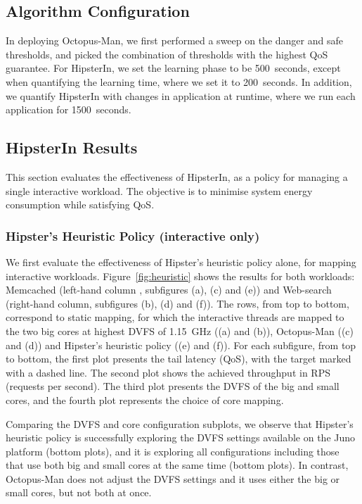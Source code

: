 \subsection{Algorithm Configuration}

In deploying Octopus-Man, we first performed a sweep on the danger and safe thresholds,
and picked the combination of thresholds with the highest QoS guarantee. For HipsterIn, we
set the learning phase to be 500~seconds, except when quantifying the learning time, where
we set it to 200~seconds. In addition, we quantify HipsterIn with changes in application
at runtime, where we run each application for 1500~seconds.



\subsection{HipsterIn Results} 
\label{subsec: results}

This section evaluates the effectiveness of HipsterIn, as a policy for managing a single
interactive workload.  The objective is to minimise system energy consumption while
satisfying QoS.

\subsubsection{Hipster's Heuristic Policy (interactive only)}
\label{subsubsec: heuristic interactive}

 We first evaluate the effectiveness of Hipster's heuristic policy alone, for
mapping interactive workloads. Figure~\ref{fig:heuristic} shows the results for both
workloads: Memcached (left-hand column , subfigures (a), (c) and (e)) and Web-search
(right-hand column, subfigures (b), (d) and (f)). The rows, from top to bottom, correspond
to static mapping, for which the interactive threads are mapped to the two big cores at
highest DVFS of \SI{1.15}{\giga\hertz} ((a) and (b)), Octopus-Man ((c) and (d)) and
Hipster's heuristic policy ((e) and (f)). For each subfigure, from top to bottom, the
first plot presents the tail latency (QoS), with the target marked with a dashed line.
The second plot shows the achieved throughput in RPS (requests per second). The third plot
presents the DVFS of the big and small cores, and the fourth plot represents the choice of
core mapping.

 Comparing the DVFS and core configuration subplots, we observe that
Hipster's heuristic policy is successfully exploring the DVFS settings available on the
Juno platform (bottom plots), and it is exploring all configurations including those that
use both big and small cores at the same time (bottom plots).  In contrast, Octopus-Man
does not adjust the DVFS settings and it uses either the big or small cores, but not both
at once. 

